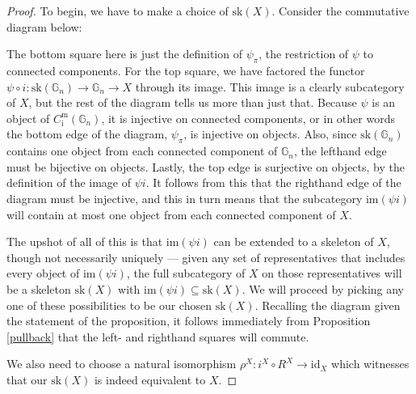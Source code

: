 \documentclass{amsart} %
\newenvironment{eq*}{\begin{equation*}}{\end{equation*}}
\begin{document}
\begin{proof}
To begin, we have to make a choice of $\mathrm{sk}(X)$. Consider the commutative diagram below:
\begin{eq*}  \end{eq*}
The bottom square here is just the definition of $\psi_\pi$, the restriction of $\psi$ to connected components. For the top square, we have factored the functor $\psi \circ i : \mathrm{sk}(\mathbb{G}_n) \to \mathbb{G}_n \to X$ through its image. This image is a clearly subcategory of $X$, but the rest of the diagram tells us more than just that. Because $\psi$ is an object of $C^{\mathrm{m}}_{\mathrm{i}}(\mathbb{G}_n)$, it is injective on connected components, or in other words the bottom edge of the diagram, $\psi_\pi$, is injective on objects. Also, since $\mathrm{sk}(\mathbb{G}_n)$ contains one object from each connected component of $\mathbb{G}_n$, the lefthand edge must be bijective on objects. Lastly, the top edge is surjective on objects, by the definition of the image of $\psi i$. It follows from this that the righthand edge of the diagram must be injective, and this in turn means that the subcategory $\mathrm{im}(\psi i)$ will contain at most one object from each connected component of $X$. 

The upshot of all of this is that $\mathrm{im}(\psi i)$ can be extended to a skeleton of $X$, though not necessarily uniquely --- given any set of representatives that includes every object of $\mathrm{im}(\psi i)$, the full subcategory of $X$ on those representatives will be a skeleton $\mathrm{sk}(X)$ with $\mathrm{im}(\psi i) \subseteq \mathrm{sk}(X)$. We will proceed by picking any one of these possibilities to be our chosen $\mathrm{sk}(X)$. Recalling the diagram given the statement of the proposition, it follows immediately from Proposition \ref{pullback} that the left- and righthand squares will commute.

We also need to choose a natural isomorphism $\rho^X : i^X \circ R^X \to \mathrm{id}_X$ which witnesses that our $\mathrm{sk}(X)$ is indeed equivalent to $X$. 


\end{proof}
\end{document}
